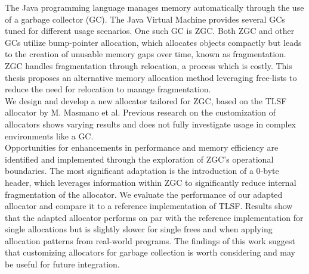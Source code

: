 
The Java programming language manages memory automatically through the use of a garbage collector (GC). The Java Virtual Machine provides several GCs tuned for different usage scenarios. One such GC is ZGC. Both ZGC and other GCs utilize bump-pointer allocation, which allocates objects compactly but leads to the creation of unusable memory gaps over time, known as fragmentation. ZGC handles fragmentation through relocation, a process which is costly. This thesis proposes an alternative memory allocation method leveraging free-lists to reduce the need for relocation to manage fragmentation.\\

We design and develop a new allocator tailored for ZGC, based on the TLSF allocator by M. Masmano et al. Previous research on the customization of allocators shows varying results and does not fully investigate usage in complex environments like a GC.\\

Opportunities for enhancements in performance and memory efficiency are identified and implemented through the exploration of ZGC's operational boundaries. The most significant adaptation is the introduction of a 0-byte header, which leverages information within ZGC to significantly reduce internal fragmentation of the allocator. We evaluate the performance of our adapted allocator and compare it to a reference implementation of TLSF. Results show that the adapted allocator performs on par with the reference implementation for single allocations but is slightly slower for single frees and when applying allocation patterns from real-world programs. The findings of this work suggest that customizing allocators for garbage collection is worth considering and may be useful for future integration.\\

